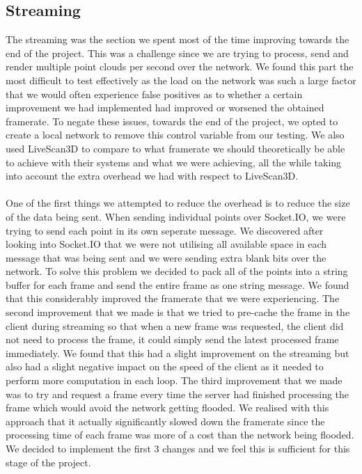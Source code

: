 \documentclass{article}
\begin{document}
\subsection{Streaming}
The streaming was the section we spent most of the time improving towards the end of the project. This was a challenge since we are trying to process, send and render multiple point clouds per second over the network. We found this part the most difficult to test effectively as the load on the network was such a large factor that we would often experience false positives as to whether a certain improvement we had implemented had improved or worsened the obtained framerate. To negate these issues, towards the end of the project, we opted to create a local network to remove this control variable from our testing. We also used LiveScan3D to compare to what framerate we should theoretically be able to achieve with their systems and what we were achieving, all the while taking into account the extra overhead we had with respect to LiveScan3D.
\\\\
One of the first things we attempted to reduce the overhead is to reduce the size of the data being sent. When sending individual points over Socket.IO, we were trying to send each point in its own seperate message. We discovered after looking into Socket.IO that we were not utilising all available space in each message that was being sent and we were sending extra blank bits over the network. To solve this problem we decided to pack all of the points into a string buffer for each frame and send the entire frame as one string message. We found that this considerably improved the framerate that we were experiencing. The second improvement that we made is that we tried to pre-cache the frame in the client during streaming so that when a new frame was requested, the client did not need to process the frame, it could simply send the latest processed frame immediately. We found that this had a slight improvement on the streaming but also had a slight negative impact on the speed of the client as it needed to perform more computation in each loop. The third improvement that we made was to try and request a frame every time the server had finished processing the frame which would avoid the network getting flooded. We realised with this approach that it actually significantly slowed down the framerate since the processing time of each frame was more of a cost than the network being flooded. We decided to implement the first 3 changes and we feel this is sufficient for this stage of the project.
\end{document}
